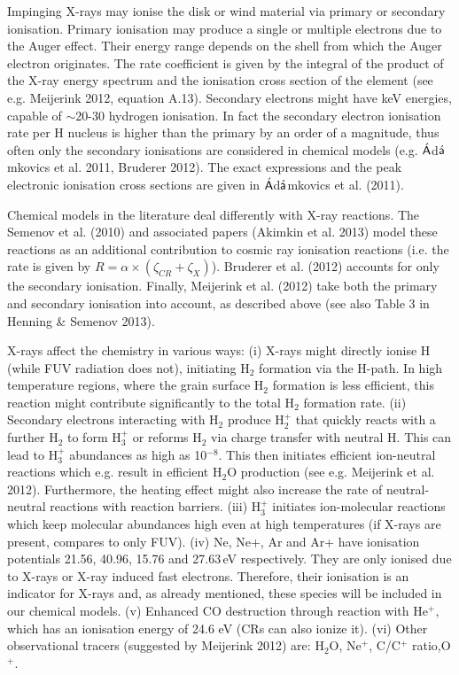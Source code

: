 \documentclass[10pt,fleqn,twoside]{article}
\begin{document}
Impinging X-rays may ionise the disk or wind material via primary or secondary ionisation. Primary ionisation may produce a single or multiple electrons due to the Auger effect. Their energy range depends on the shell from which  the Auger electron originates. The rate coefficient is given by the integral of the product of the X-ray energy spectrum and the ionisation cross section of the element (see e.g. Meijerink 2012, equation A.13). Secondary electrons might have keV energies, capable of $\sim$20-30 hydrogen ionisation. In fact the secondary electron ionisation rate per H nucleus is higher than the primary by an order of a magnitude, thus often only the secondary ionisations are considered in chemical models (e.g. $\acute{\textsf A}$d$\acute{\textsf a}$mkovics et al. 2011, Bruderer 2012).
The exact expressions and the peak electronic ionisation cross sections are given in $\acute{\textsf A}$d$\acute{\textsf a}$mkovics et al. (2011). 

Chemical models in the literature deal differently with X-ray reactions. The Semenov et al. (2010) and associated papers (Akimkin et al. 2013) model these reactions as an additional contribution to cosmic ray ionisation reactions (i.e. the rate is given by $R = \alpha \times (\zeta_{CR} + \zeta_X)$). Bruderer et al. (2012) accounts for only the secondary ionisation. Finally, Meijerink et al. (2012) take both the primary and secondary ionisation into account, as described above (see also Table 3 in Henning \& Semenov 2013).

X-rays affect the chemistry in various ways: (i) X-rays might directly ionise H (while FUV radiation does not), initiating H$_2$ formation via the H-path. In high temperature regions, where the grain surface H$_2$ formation is less efficient, this reaction might contribute significantly to the total H$_2$ formation rate. (ii) Secondary electrons interacting with H$_2$ produce H$_2^+$ that quickly reacts with a further H$_2$ to form H$_3^+$ or reforms H$_2$ via charge transfer with neutral H. This can lead to H$_3^+$ abundances as high as 10$^{-8}$. This then initiates efficient ion-neutral reactions which e.g. result in efficient H$_2$O production (see e.g. Meijerink et al. 2012). Furthermore, the heating effect might also increase the rate of neutral-neutral reactions with reaction barriers. (iii) H$_3^+$ initiates ion-molecular reactions which keep molecular abundances high even at high temperatures (if X-rays are present, compares to only FUV). (iv)
Ne, Ne+, Ar and Ar+ have ionisation potentials 21.56, 40.96, 15.76 and 27.63\,eV respectively. They are only ionised due to X-rays or X-ray induced fast electrons. Therefore, their ionisation is an indicator for X-rays and, as already mentioned, these species will be included in our chemical models. (v) Enhanced CO destruction through reaction with He$^+$, which has an ionisation energy of 24.6 eV (CRs can also ionize it). (vi) Other observational tracers (suggested by Meijerink 2012) are: H$_2$O, Ne$^+$, C/C$^+$ ratio,O$^+$.
\end{document}
